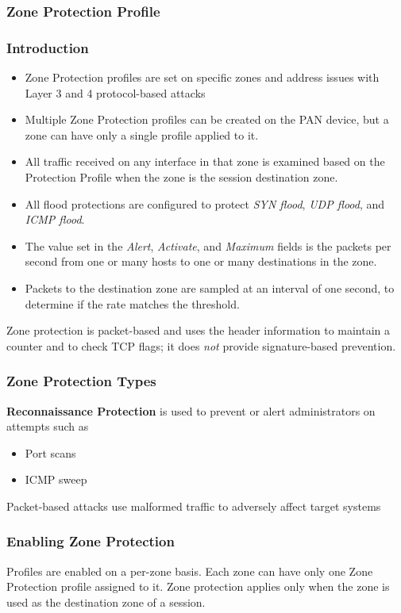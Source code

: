 \subsubsection{Zone Protection Profile}
\subsubsection{Introduction}
\begin{itemize}
    \item Zone Protection profiles are set on specific zones and address issues with Layer 3 and 4 protocol-based attacks
    \item Multiple Zone Protection profiles can be created on the PAN device, but a zone can have only a single profile applied to it.
    \item All traffic received on any interface in that zone is examined based on the Protection Profile when the zone is the session destination zone.
    \item All flood protections are configured to protect \textit{SYN flood}, \textit{UDP flood}, and \textit{ICMP flood}.
    \item The value set in the \textit{Alert}, \textit{Activate}, and \textit{Maximum} fields is the packets per second from one or many hosts to one or many destinations in the zone.
    \item Packets to the destination zone are sampled at an interval of one second, to determine if the rate matches the threshold.
\end{itemize}
Zone protection is packet-based and uses the header information to maintain a counter and to check TCP flags; it does \textit{not} provide signature-based prevention.
\subsubsection{Zone Protection Types}
\textbf{Reconnaissance Protection} is used to prevent or alert administrators on attempts such as
\begin{itemize}
    \item Port scans
    \item ICMP sweep
\end{itemize}
Packet-based attacks use malformed traffic to adversely affect target systems
\subsubsection{Enabling Zone Protection}
Profiles are enabled on a per-zone basis. Each zone can have only one Zone Protection profile assigned to it.
Zone protection applies only when the zone is used as the destination zone of a session.

